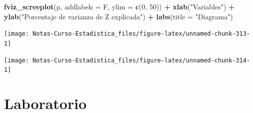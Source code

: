 \documentclass[
  12pt,
]{book}
\newenvironment{Shaded}{\begin{snugshade}}{\end{snugshade}}
\newcommand{\DataTypeTok}[1]{\textcolor[rgb]{0.13,0.29,0.53}{#1}}
\newcommand{\DecValTok}[1]{\textcolor[rgb]{0.00,0.00,0.81}{#1}}
\newcommand{\KeywordTok}[1]{\textcolor[rgb]{0.13,0.29,0.53}{\textbf{#1}}}
\newcommand{\NormalTok}[1]{#1}
\newcommand{\OperatorTok}[1]{\textcolor[rgb]{0.81,0.36,0.00}{\textbf{#1}}}
\newcommand{\StringTok}[1]{\textcolor[rgb]{0.31,0.60,0.02}{#1}}
\theoremstyle{definition}
\theoremstyle{definition}
\theoremstyle{definition}
\theoremstyle{remark}
\begin{document}
\begin{Shaded}
\begin{Highlighting}[]
\KeywordTok{fviz_screeplot}\NormalTok{(p, }\DataTypeTok{addlabels =}\NormalTok{ F, }\DataTypeTok{ylim =} \KeywordTok{c}\NormalTok{(}\DecValTok{0}\NormalTok{, }\DecValTok{50}\NormalTok{)) }\OperatorTok{+}\StringTok{ }
\StringTok{    }\KeywordTok{xlab}\NormalTok{(}\StringTok{"Variables"}\NormalTok{) }\OperatorTok{+}\StringTok{ }\KeywordTok{ylab}\NormalTok{(}\StringTok{"Porcentaje de varianza de Z explicada"}\NormalTok{) }\OperatorTok{+}\StringTok{ }
\StringTok{    }\KeywordTok{labs}\NormalTok{(}\DataTypeTok{title =} \StringTok{"Diagrama"}\NormalTok{)}
\end{Highlighting}
\end{Shaded}

\begin{center}\texttt{[image: Notas-Curso-Estadistica\_files/figure-latex/unnamed-chunk-313-1]} \end{center}

\begin{Shaded}
\end{Shaded}

\begin{center}\texttt{[image: Notas-Curso-Estadistica\_files/figure-latex/unnamed-chunk-314-1]} \end{center}

\hypertarget{laboratorio-7}{%
\section{Laboratorio}\label{laboratorio-7}}
\end{document}
